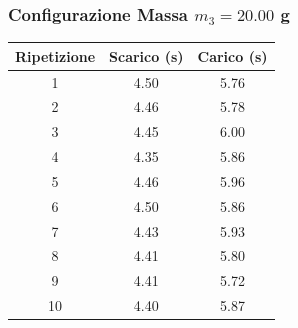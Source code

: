 \documentclass[a4paper,12pt]{article}
\begin{document}
\subsubsection*{Configurazione Massa $m_3 = 20.00$ g}
\noindent
\begin{minipage}[c]{0.45\textwidth}
\centering
\small
\begin{tabular}{ccc}
\hline
\textbf{Ripetizione} & \textbf{Scarico (s)} & \textbf{Carico (s)} \\ \hline
1  & 4.50 & 5.76 \\
2  & 4.46 & 5.78 \\
3  & 4.45 & 6.00 \\
4  & 4.35 & 5.86 \\
5  & 4.46 & 5.96 \\
6  & 4.50 & 5.86 \\
7  & 4.43 & 5.93 \\
8  & 4.41 & 5.80 \\
9  & 4.41 & 5.72 \\
10 & 4.40 & 5.87 \\ \hline
\end{tabular}
\label{tab:dinamica_massa3}
\end{minipage}
\hfill
\begin{minipage}[c]{0.50\textwidth}
\centering
{}
\label{fig:isto_massa3}
\end{minipage}

\vspace{0.8cm}

\end{document}
